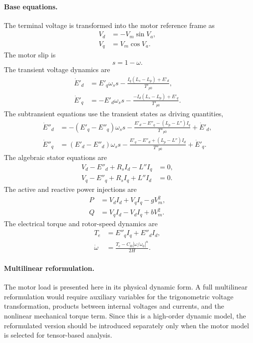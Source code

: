 \paragraph{Base equations.}
The terminal voltage is transformed into the motor reference frame as
\begin{align}
    V_d &= -V_m\sin V_a, \\
    V_q &= V_m\cos V_a.
\end{align}
The motor slip is
\begin{equation}
    s = 1-\omega.
\end{equation}
The transient voltage dynamics are
\begin{align}
    \dot{E}'_d &= E'_q\omega_s s - \frac{I_q\left(L_s-L_p\right)+E'_d}{T'_{p0}}, \\
    \dot{E}'_q &= -E'_d\omega_s s - \frac{-I_d\left(L_s-L_p\right)+E'_q}{T'_{p0}}.
\end{align}
The subtransient equations use the transient states as driving quantities,
\begin{align}
    \dot{E}''_d &= -\left(E'_q-E''_q\right)\omega_s s - \frac{E'_d-E''_q-\left(L_p-L''\right)I_q}{T''_{p0}} + \dot{E}'_d, \\
    \dot{E}''_q &= \left(E'_d-E''_d\right)\omega_s s - \frac{E'_q-E''_d+\left(L_p-L''\right)I_d}{T''_{p0}} + \dot{E}'_q.
\end{align}
The algebraic stator equations are
\begin{align}
    V_d - E''_d + R_s I_d - L'' I_q &= 0, \\
    V_q - E''_q + R_s I_q + L'' I_d &= 0.
\end{align}
The active and reactive power injections are
\begin{align}
    P &= V_d I_d + V_q I_q - g V_m^2, \\
    Q &= V_q I_d - V_d I_q + b V_m^2.
\end{align}
The electrical torque and rotor-speed dynamics are
\begin{align}
    T_e &= E''_q I_q + E''_d I_d, \\
    \dot{\omega} &= \frac{T_e - C_{l0}\left|\omega/\omega_0\right|^n}{2H}.
\end{align}

\paragraph{Multilinear reformulation.}
The motor load is presented here in its physical dynamic form. A full multilinear reformulation would require auxiliary variables for the trigonometric voltage transformation, products between internal voltages and currents, and the nonlinear mechanical torque term. Since this is a high-order dynamic model, the reformulated version should be introduced separately only when the motor model is selected for tensor-based analysis.

